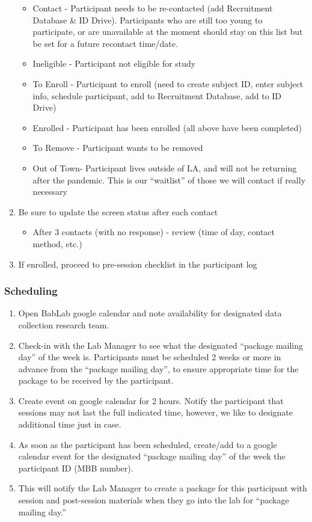 \documentclass[]{book}
\providecommand{\tightlist}{%
  \setlength{\itemsep}{0pt}\setlength{\parskip}{0pt}}
\begin{document}
\begin{enumerate}
  \begin{itemize}
  \tightlist
  \item
    Contact - Participant needs to be re-contacted (add Recruitment Database \& ID Drive). Participants who are still too young to participate, or are unavailable at the moment should stay on this list but be set for a future recontact time/date.
  \item
    Ineligible - Participant not eligible for study
  \item
    To Enroll - Participant to enroll (need to create subject ID, enter subject info, schedule participant, add to Recruitment Database, add to ID Drive)
  \item
    Enrolled - Participant has been enrolled (all above have been completed)
  \item
    To Remove - Participant wants to be removed
  \item
    Out of Town- Participant lives outside of LA, and will not be returning after the pandemic. This is our ``waitlist'' of those we will contact if really necessary
  \end{itemize}
\item
  Be sure to update the screen status after each contact

  \begin{itemize}
  \tightlist
  \item
    After 3 contacts (with no response) - review (time of day, contact method, etc.)
  \end{itemize}
\item
  If enrolled, proceed to pre-session checklist in the participant log
\end{enumerate}

\hypertarget{scheduling}{%
\subsubsection{Scheduling}\label{scheduling}}

\begin{enumerate}
\def\labelenumi{\arabic{enumi}.}
\tightlist
\item
  Open BabLab google calendar and note availability for designated data collection research team.
\item
  Check-in with the Lab Manager to see what the designated ``package mailing day'' of the week is.
  Participants must be scheduled 2 weeks or more in advance from the ``package mailing day'', to ensure appropriate time for the package to be received by the participant.
\item
  Create event on google calendar for 2 hours. Notify the participant that sessions may not last the full indicated time, however, we like to designate additional time just in case.
\item
  As soon as the participant has been scheduled, create/add to a google calendar event for the designated ``package mailing day'' of the week the participant ID (MBB number).
\item
  This will notify the Lab Manager to create a package for this participant with session and post-session materials when they go into the lab for ``package mailing day.''
\end{enumerate}
\end{document}
